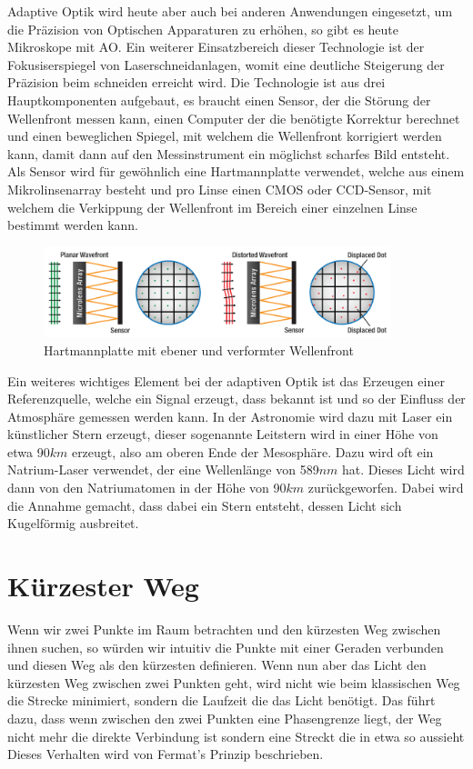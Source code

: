 \begin{refsection}
Adaptive Optik wird heute aber auch bei anderen Anwendungen eingesetzt, um die Präzision von Optischen Apparaturen zu erhöhen, so gibt es heute Mikroskope mit AO. Ein weiterer Einsatzbereich dieser Technologie ist der Fokusiserspiegel von Laserschneidanlagen, womit eine deutliche Steigerung der Präzision beim schneiden erreicht wird.\newline
Die Technologie ist aus drei Hauptkomponenten aufgebaut, es braucht einen Sensor, der die Störung der Wellenfront messen kann, einen Computer der die benötigte Korrektur berechnet und einen beweglichen Spiegel, mit welchem die Wellenfront korrigiert werden kann, damit dann auf den Messinstrument ein möglichst scharfes Bild entsteht.\newline
Als Sensor wird für gewöhnlich eine Hartmannplatte verwendet, welche aus einem Mikrolinsenarray besteht und pro Linse einen CMOS oder CCD-Sensor, mit welchem die Verkippung der Wellenfront im Bereich einer einzelnen Linse bestimmt werden kann. 

\begin{figure}
  \centering
  \includegraphics[width=0.9\textwidth]{adaptiv/images/hartmannplatte}
  \caption{Hartmannplatte mit ebener und verformter Wellenfront
    \cite{thor:hartmannplatte}}
  \label{fig:hartmannplatte}
\end{figure}

Ein weiteres wichtiges Element bei der adaptiven Optik ist das Erzeugen einer Referenzquelle, welche ein Signal erzeugt, dass bekannt ist und so der Einfluss der Atmosphäre gemessen werden kann. In der Astronomie wird dazu mit Laser ein künstlicher Stern erzeugt, dieser sogenannte Leitstern wird in einer Höhe von etwa 90$km$ erzeugt, also am oberen Ende der Mesosphäre. Dazu wird oft ein Natrium-Laser verwendet, der eine Wellenlänge von 589$nm$ hat. Dieses Licht wird dann von den Natriumatomen in der Höhe von 90$km$ zurückgeworfen. Dabei wird die Annahme gemacht, dass dabei ein Stern entsteht, dessen Licht sich Kugelförmig ausbreitet. 

\section{Kürzester Weg}
Wenn wir zwei Punkte im Raum betrachten und den kürzesten Weg zwischen ihnen suchen, so würden wir intuitiv die Punkte mit einer Geraden verbunden und diesen Weg als den kürzesten definieren. Wenn nun aber das Licht den kürzesten Weg zwischen zwei Punkten geht, wird nicht wie beim klassischen Weg die Strecke minimiert, sondern die Laufzeit die das Licht benötigt. Das führt dazu, dass wenn zwischen den zwei Punkten eine Phasengrenze liegt, der Weg nicht mehr die direkte Verbindung ist sondern eine Streckt die in etwa so aussieht Dieses Verhalten wird von Fermat's Prinzip beschrieben.


\end{refsection}
